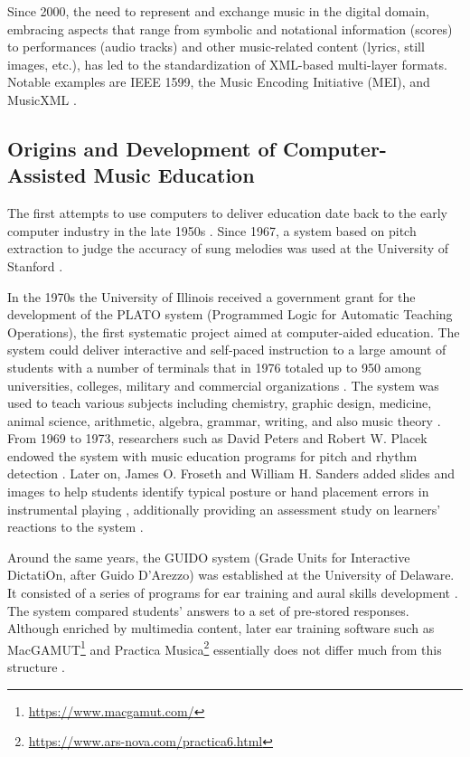\documentclass[10pt,journal,compsoc]{IEEEtran}
\begin{document}
Since 2000, the need to represent and exchange music in the digital domain, embracing aspects that range from symbolic and notational information (scores) to performances (audio tracks) and other music-related content (lyrics, still images, etc.), has led to the standardization of XML-based multi-layer formats. Notable examples are IEEE 1599, the Music Encoding Initiative (MEI), and MusicXML \cite{bhlp2019investigatinginterpretative,barate2012newfrontiers}.


\subsection{Origins and Development of Computer-Assisted Music Education}\label{subsec:MLA}
The first attempts to use computers to deliver education date back to the early computer industry in the late 1950s \cite{suppes1978}. Since 1967, a system based on pitch extraction to judge the accuracy of sung melodies was used at the University of Stanford \cite{kuhn1967}. 

In the 1970s the University of Illinois received a government grant for the development of the PLATO system (Programmed Logic for Automatic Teaching Operations), the first systematic project aimed at computer-aided education.  The system could deliver interactive and self-paced instruction to a large amount of students with a number of terminals that in 1976 totaled up to 950 among universities, colleges, military and commercial organizations \cite{smith1976educational}. The system was used to teach various subjects including chemistry, graphic design, medicine, animal science, arithmetic, algebra, grammar, writing, and also music theory \cite{hofstetter1981computer}. From 1969 to 1973, researchers such as David Peters and Robert W. Placek endowed the system with music education programs for pitch and rhythm detection \cite{peters1974, placek1973}. Later on, James O. Froseth and William H. Sanders added slides and images to help students identify typical posture or hand placement errors in instrumental playing \cite{froseth2004}, additionally providing an assessment study on learners' reactions to the system \cite{sanders1979}. 

Around the same years, the GUIDO system (Grade Units for Interactive DictatiOn, after Guido D'Arezzo) was established at the University of Delaware. It consisted of a series of programs for ear training and aural skills development \cite{hofstetter1975guido,eddins1981brief}. The system compared students' answers to a set of pre-stored responses. 
Although enriched by multimedia content, later ear training software such as MacGAMUT\footnote{\url{https://www.macgamut.com/}} and Practica Musica\footnote{\url{https://www.ars-nova.com/practica6.html}} essentially does not differ much from this structure \cite{brandao1999computers}. 
\end{document}
